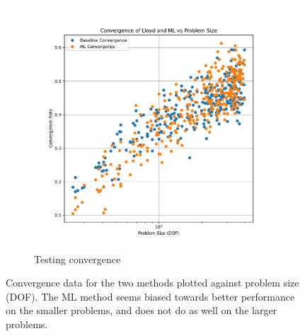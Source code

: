\documentclass{article}
\begin{document}
\begin{figure}[h]
\begin{subfigure}[t]{0.49\textwidth}
    \includegraphics[width=\textwidth]{test_convergence_per_size.pdf}
    \caption{Testing convergence}
  \end{subfigure}
  \caption{Convergence data for the two methods plotted against problem size (DOF).  The ML method seems biased towards better performance on the smaller problems, and does not do as well on the larger problems.}
  \label{fig:conv_per_size}
\end{figure}
\end{document}

